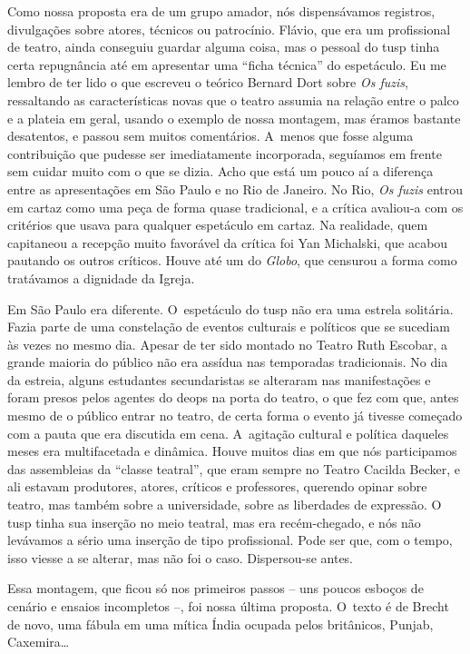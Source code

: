 Como nossa proposta era de um grupo amador, nós dispensávamos registros,
divulgações sobre atores, técnicos ou patrocínio. Flávio, que era um
profissional de teatro, ainda conseguiu guardar alguma coisa, mas o
pessoal do {\sc tusp} tinha certa repugnância até em apresentar uma “ficha
técnica” do espetáculo. Eu me lembro de ter lido o que escreveu o
teórico Bernard Dort sobre {\it Os fuzis}, ressaltando as características
novas que o teatro assumia na relação entre o palco e a plateia em
geral, usando o exemplo de nossa montagem, mas éramos bastante
desatentos, e passou sem muitos comentários. A~menos que fosse alguma
contribuição que pudesse ser imediatamente incorporada, seguíamos em
frente sem cuidar muito com o que se dizia. Acho que está um pouco aí a
diferença entre as apresentações em São Paulo e no Rio de Janeiro. No
Rio, {\it Os fuzis} entrou em cartaz como uma peça de forma quase
tradicional, e a crítica avaliou-a com os critérios que usava para qualquer
espetáculo em cartaz. Na realidade, quem capitaneou a recepção muito
favorável da crítica foi Yan Michalski, que acabou pautando os outros
críticos. Houve até um do {\it Globo}, que censurou a forma como tratávamos
a dignidade da Igreja.

Em São Paulo era diferente. O~espetáculo do {\sc tusp} não era uma estrela
solitária. Fazia parte de uma constelação de eventos culturais e
políticos que se sucediam às vezes no mesmo dia. Apesar de ter sido
montado no Teatro Ruth Escobar, a grande maioria do público não era
assídua nas temporadas tradicionais. No dia da estreia, alguns estudantes
secundaristas se alteraram nas manifestações e foram presos pelos
agentes do {\sc deops} na porta do teatro, o que fez com que, antes mesmo de o
público entrar no teatro, de certa forma o evento já tivesse começado
com a pauta que era discutida em cena. A~agitação cultural e política
daqueles meses era multifacetada e dinâmica. Houve muitos dias em que
nós participamos das assembleias da “classe teatral”, que eram sempre no
Teatro Cacilda Becker, e ali estavam produtores, atores, críticos e
professores, querendo opinar sobre teatro, mas também sobre a
universidade, sobre as liberdades de expressão. O {\sc tusp} tinha sua
inserção no meio teatral, mas era recém-chegado, e nós não levávamos a
sério uma inserção de tipo profissional. Pode ser que, com o tempo, isso
viesse a se alterar, mas não foi o caso. Dispersou-se antes.

\subject{A montagem truncada de “Mann ist Mann”}

Essa montagem, que ficou só nos primeiros passos -- uns poucos esboços de
cenário e ensaios incompletos --, foi nossa última proposta. O~texto é de
Brecht de novo, uma fábula em uma mítica Índia ocupada pelos britânicos,
Punjab, Caxemira\ldots{}

